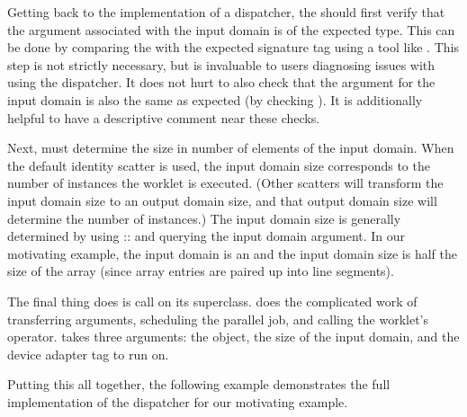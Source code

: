 
Getting back to the implementation of a dispatcher, the  should first verify that the \controlsignature argument associated with the input domain is of the expected type.
This can be done by comparing the  with the expected signature tag using a tool like .
This step is not strictly necessary, but is invaluable to users diagnosing issues with using the dispatcher.
It does not hurt to also check that the  argument for the input domain is also the same as expected (by checking ).
It is additionally helpful to have a descriptive comment near these checks.


Next,  must determine the size in number of elements of the input domain.
When the default identity scatter is used, the input domain size corresponds to the number of instances the worklet is executed.
(Other scatters will transform the input domain size to an output domain size, and that output domain size will determine the number of instances.)
The input domain size is generally determined by using :: and querying the input domain argument.
In our motivating example, the input domain is an  and the input domain size is half the size of the array (since array entries are paired up into line segments).

The final thing  does is call  on its  superclass.
 does the complicated work of transferring arguments, scheduling the parallel job, and calling the worklet's operator.
 takes three arguments: the  object, the size of the input domain, and the device adapter tag to run on.


Putting this all together, the following example demonstrates the full implementation of the dispatcher for our motivating example.


